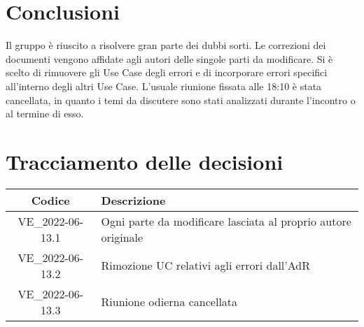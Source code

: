 \section{Conclusioni}
Il gruppo è riuscito a risolvere gran parte dei dubbi sorti. Le correzioni dei documenti vengono affidate 
agli autori delle singole parti da modificare.
\newline
Si è scelto di rimuovere gli Use Case degli errori e di incorporare errori specifici all'interno degli altri 
Use Case.
\newline
L'usuale riunione fissata alle 18:10 è stata cancellata, in quanto i temi da discutere sono stati analizzati 
durante l'incontro o al termine di esso.
\newpage

\section*{Tracciamento delle decisioni}
	\renewcommand{\arraystretch}{1.8} %
	\begin{tabular}{ |c|l| }
		\hline
		\textbf{Codice} & \textbf{Descrizione} \\
		\hline
		VE\_2022-06-13.1 & Ogni parte da modificare lasciata al proprio autore originale\\ %
		\hline
		VE\_2022-06-13.2 & Rimozione UC relativi agli errori dall'AdR\\ %
		\hline
		VE\_2022-06-13.3 & Riunione odierna cancellata\\ %
		\hline
	\end{tabular}